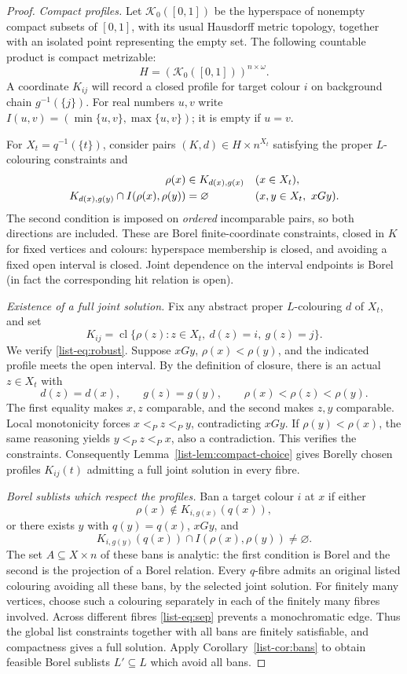 \documentclass[11pt,reqno]{amsart}
\theoremstyle{plain}
\theoremstyle{definition}
\theoremstyle{remark}
\newcommand{\Kz}{\mathcal K_0([0,1])}
\begin{document}
\begin{proof}
\noindent\emph{Compact profiles.}
Let $\Kz$ be the hyperspace of nonempty compact subsets of $[0,1]$, with
its usual Hausdorff metric topology, together with an isolated point
representing the empty set. The following countable product is compact
metrizable:
\[
H=(\Kz)^{n\times\omega}.
\]
A coordinate $K_{ij}$ will record a closed profile for target colour $i$
on background chain $g^{-1}(\{j\})$.
For real numbers $u,v$ write
$I(u,v)=(\min\{u,v\},\max\{u,v\})$; it is empty if $u=v$.

For $X_t=q^{-1}(\{t\})$, consider pairs $(K,d)\in H\times n^{X_t}$
satisfying the proper $L$-colouring constraints and
\begin{align}
\rho(x)&\in K_{d(x),g(x)} &&(x\in X_t),\notag\\
K_{d(x),g(y)}\cap I(\rho(x),\rho(y))&=\varnothing
&&(x,y\in X_t,\ xGy).\label{list-eq:robust}
\end{align}
The second condition is imposed on \emph{ordered} incomparable pairs,
so both directions are included. These are Borel finite-coordinate
constraints, closed in $K$ for fixed vertices and colours: hyperspace
membership is closed, and avoiding a fixed open interval is closed.
Joint dependence on the interval endpoints is Borel (in fact the
corresponding hit relation is open).

\smallskip
\noindent\emph{Existence of a full joint solution.}
Fix any abstract proper $L$-colouring $d$ of $X_t$, and set
\begin{equation*}
K_{ij}=\operatorname{cl}\{\rho(z):z\in X_t,\ d(z)=i,\ g(z)=j\}.
\end{equation*}
We verify \eqref{list-eq:robust}. Suppose $xGy$, $\rho(x)<\rho(y)$, and the
indicated profile meets the open interval. By the definition of closure,
there is an actual $z\in X_t$ with
\[
d(z)=d(x),\qquad g(z)=g(y),\qquad
\rho(x)<\rho(z)<\rho(y).
\]
The first equality makes $x,z$ comparable, and the second makes $z,y$
comparable. Local monotonicity forces $x<_P z<_P y$, contradicting
$xGy$. If $\rho(y)<\rho(x)$, the same reasoning yields
$y<_P z<_P x$, also a contradiction. This verifies the constraints.
Consequently Lemma~\ref{list-lem:compact-choice} gives Borelly chosen profiles
$K_{ij}(t)$ admitting a full joint solution in every fibre.

\smallskip
\noindent\emph{Borel sublists which respect the profiles.}
Ban a target colour $i$ at $x$ if either
\[
\rho(x)\notin K_{i,g(x)}(q(x)),
\]
or there exists $y$ with $q(y)=q(x)$, $xGy$, and
\[
K_{i,g(y)}(q(x))\cap I(\rho(x),\rho(y))\ne\varnothing.
\]
The set $A\subseteq X\times n$ of these bans is analytic: the first
condition is Borel and the second is the projection of a Borel relation.
Every $q$-fibre admits an original listed colouring avoiding all these
bans, by the selected joint solution. For finitely many vertices, choose
such a colouring separately in each of the finitely many fibres involved.
Across different fibres \eqref{list-eq:sep} prevents a monochromatic edge.
Thus the global list constraints together with all bans are finitely
satisfiable, and compactness gives a full solution. Apply
Corollary~\ref{list-cor:bans} to obtain feasible Borel sublists $L'\subseteq L$
which avoid all bans.


\end{proof}
\end{document}
